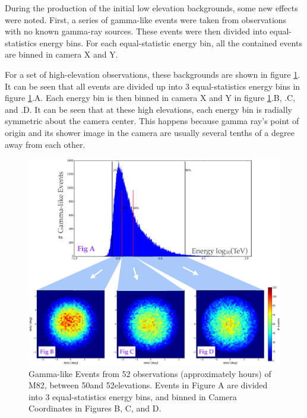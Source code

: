 During the production of the initial low elevation backgrounds, some new effects were noted.
First, a series of gamma-like events were taken from observations with no known gamma-ray sources.
These events were then divided into equal-statistics energy bins.
For each equal-statistic energy bin, all the contained events are binned in camera X and Y.

For a set of high-elevation observations, these backgrounds are shown in figure \ref{fig:back_highelev}.
It can be seen that all events are divided up into 3 equal-statistics energy bins in figure \ref{fig:back_highelev}.A.
Each energy bin is then binned in camera X and Y in figure \ref{fig:back_highelev}.B, .C, and .D.
It can be seen that at these high elevations, each energy bin is radially symmetric about the camera center.
This happens because gamma ray's point of origin and its shower image in the camera are usually several tenths of a degree away from each other.

\begin{figure}[ht]
  \begin{center}
    \includegraphics[width=\textwidth]{images/ctools/backgrounds_highelev.eps}
    \caption[FITS Background at 50\degree Elevation]{Gamma-like Events from 52 observations (approximately  hours) of M82, between 50\degree  and 52\degree  elevations.  Events in Figure A are divided into 3 equal-statistics energy bins, and binned in Camera Coordinates in Figures B, C, and D.}\label{fig:back_highelev}
  \end{center}
\end{figure}

